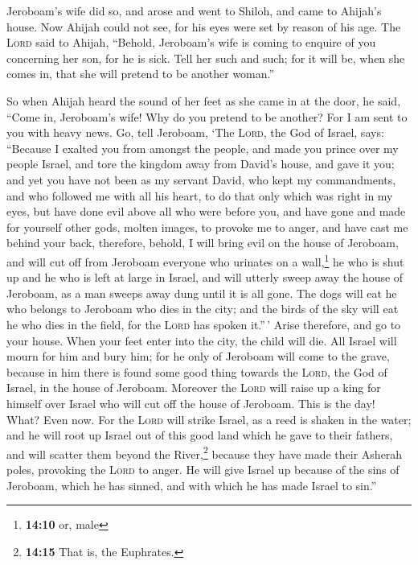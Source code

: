  Jeroboam's wife did so, and arose and went to Shiloh, and
came to Ahijah's house. Now Ahijah could not see, for his eyes were set
by reason of his age.  The \textsc{Lord} said to Ahijah,
``Behold, Jeroboam's wife is coming to enquire of you concerning her
son, for he is sick. Tell her such and such; for it will be, when she
comes in, that she will pretend to be another woman.''

 So when Ahijah heard the sound of her feet as she came in
at the door, he said, ``Come in, Jeroboam's wife! Why do you pretend to
be another? For I am sent to you with heavy news.  Go,
tell Jeroboam, `The \textsc{Lord}, the God of Israel, says: ``Because I
exalted you from amongst the people, and made you prince over my people
Israel,  and tore the kingdom away from David's house, and
gave it you; and yet you have not been as my servant David, who kept my
commandments, and who followed me with all his heart, to do that only
which was right in my eyes,  but have done evil above all
who were before you, and have gone and made for yourself other gods,
molten images, to provoke me to anger, and have cast me behind your
back,  therefore, behold, I will bring evil on the house
of Jeroboam, and will cut off from Jeroboam everyone who urinates on a
wall,\footnote{\textbf{14:10} or, male} he who is shut up and he who is
left at large in Israel, and will utterly sweep away the house of
Jeroboam, as a man sweeps away dung until it is all gone.
 The dogs will eat he who belongs to Jeroboam who dies in
the city; and the birds of the sky will eat he who dies in the field,
for the \textsc{Lord} has spoken it.''\,'  Arise
therefore, and go to your house. When your feet enter into the city, the
child will die.  All Israel will mourn for him and bury
him; for he only of Jeroboam will come to the grave, because in him
there is found some good thing towards the \textsc{Lord}, the God of
Israel, in the house of Jeroboam.  Moreover the
\textsc{Lord} will raise up a king for himself over Israel who will cut
off the house of Jeroboam. This is the day! What? Even now.
 For the \textsc{Lord} will strike Israel, as a reed is
shaken in the water; and he will root up Israel out of this good land
which he gave to their fathers, and will scatter them beyond the
River,\footnote{\textbf{14:15} That is, the Euphrates.} because they
have made their Asherah poles, provoking the \textsc{Lord} to anger.
 He will give Israel up because of the sins of Jeroboam,
which he has sinned, and with which he has made Israel to sin.''

